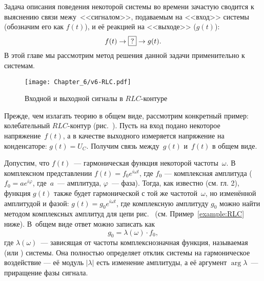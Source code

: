 
Задача описания поведения некоторой системы во времени зачастую сводится 
к выяснению связи межу~<<сигналом>>, подаваемым на <<вход>> системы 
(обозначим его как $f(t)$), и её реакцией на <<выходе>> ($g(t)$):
\begin{equation*}
f(t)\to\fbox{?} \to g(t).
\end{equation*}
В этой главе мы рассмотрим  метод решения данной задачи применительно
к  системам.

\begin{wrapfigure}[10]{o}{0.3\textwidth}
    \centering
    \texttt{[image: Chapter\_6/v6-RLC.pdf]}
    \caption{Входной и выходной сигналы в $RLC$-контуре}
\end{wrapfigure}

Прежде, чем излагать теорию в общем виде, рассмотрим конкретный пример:
колебательный $RLC$-кон\-ту\-р (рис.~).
Пусть на вход подано некоторое напряжение~$f(t)$,
а в качестве выходного измеряется напряжение на конденсаторе: $g(t) = U_C$. 
Получим связь между~$g(t)$ и~$f(t)$ в общем виде.

Допустим, что $f(t)$~--- гармоническая функция некоторой частоты~$\omega$.
В комплексном представлении $f(t) = f_0 e^{i\omega t}$, где 
$f_0$ --- комплексная амплитуда ($f_0=ae^{i\varphi}$, 
где~$a$~--- амплитуда, $\varphi$~--- фаза).
Тогда, как известно (см. гл. 2),
функция $g(t)$ также будет гармонической с той же частотой~$\omega$, 
но изменённой амплитудой и фазой: $g(t) = g_0 e^{i\omega t}$, где
комплексную амплитуду $g_0$ можно найти методом комплексных амплитуд
для цепи рис.~ (см. Пример~\ref{example:RLC} ниже).
В~общем виде ответ можно записать как
\begin{equation*}
g_0 = \lambda(\omega)\cdot f_0,
\end{equation*}
где $\lambda(\omega)$~--- зависящая от частоты комплекснозначная функция,
называемая  (или ) системы.
Она полностью определяет отклик системы на гармоническое воздействие 
--- её модуль $|\lambda|$ есть изменение амплитуды, а её аргумент
$\arg \lambda$~--- приращение фазы сигнала.

